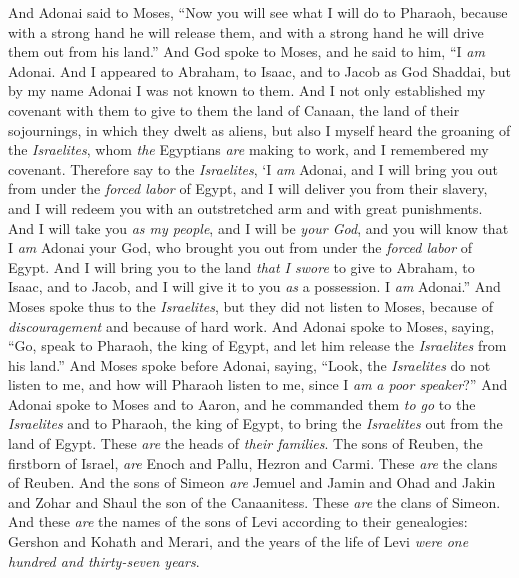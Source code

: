 \begin{biblechapter} %
 And Adonai said to Moses, “Now you will see what I will do to Pharaoh, because with a strong hand he will release them, and with a strong hand he will drive them out from his land.”
\verse And God spoke to Moses, and he said to him, “I \textit{am} Adonai.
\verse And I appeared to Abraham, to Isaac, and to Jacob as God Shaddai, but by my name Adonai I was not known to them.
\verse And I not only established my covenant with them to give to them the land of Canaan, the land of their sojournings, in which they dwelt as aliens,
\verse but also I myself heard the groaning of the \textit{Israelites}, whom \textit{the} Egyptians \textit{are} making to work, and I remembered my covenant.
\verse Therefore say to the \textit{Israelites}, ‘I \textit{am} Adonai, and I will bring you out from under the \textit{forced labor} of Egypt, and I will deliver you from their slavery, and I will redeem you with an outstretched arm and with great punishments.
\verse And I will take you \textit{as my people}, and I will be \textit{your God}, and you will know that I \textit{am} Adonai your God, who brought you out from under the \textit{forced labor} of Egypt.
\verse And I will bring you to the land \textit{that I swore} to give to Abraham, to Isaac, and to Jacob, and I will give it to you \textit{as} a possession. I \textit{am} Adonai.”
\verse And Moses spoke thus to the \textit{Israelites}, but they did not listen to Moses, because of \textit{discouragement} and because of hard work.
\verse And Adonai spoke to Moses, saying,
\verse “Go, speak to Pharaoh, the king of Egypt, and let him release the \textit{Israelites} from his land.”
\verse And Moses spoke before Adonai, saying, “Look, the \textit{Israelites} do not listen to me, and how will Pharaoh listen to me, since I \textit{am} \textit{a poor speaker}?”
\verse And Adonai spoke to Moses and to Aaron, and he commanded them \textit{to go} to the \textit{Israelites} and to Pharaoh, the king of Egypt, to bring the \textit{Israelites} out from the land of Egypt.
 These \textit{are} the heads of \textit{their families}. The sons of Reuben, the firstborn of Israel, \textit{are} Enoch and Pallu, Hezron and Carmi. These \textit{are} the clans of Reuben.
\verse And the sons of Simeon \textit{are} Jemuel and Jamin and Ohad and Jakin and Zohar and Shaul the son of the Canaanitess. These \textit{are} the clans of Simeon.
\verse And these \textit{are} the names of the sons of Levi according to their genealogies: Gershon and Kohath and Merari, and the years of the life of Levi \textit{were} \textit{one hundred and thirty-seven years}.

\end{biblechapter}
